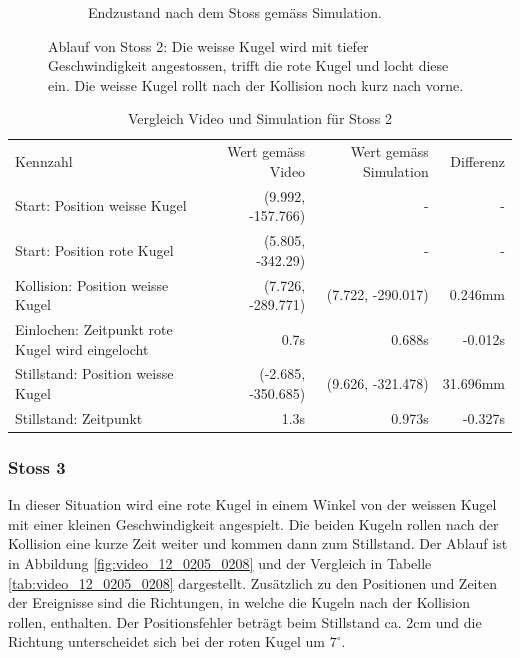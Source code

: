 \begin{figure}[h!]
\begin{subfigure}[t]{0.2\textwidth}
        \caption{Endzustand nach dem Stoss gemäss Simulation.}
        \label{fig:simulation_vs_reality_1_0028_0032_simulation}
    \end{subfigure}
    \caption{
        Ablauf von Stoss 2: Die weisse Kugel wird mit tiefer Geschwindigkeit angestossen, trifft die rote Kugel und locht diese ein.
        Die weisse Kugel rollt nach der Kollision noch kurz nach vorne.
    }
    \label{fig:simulation_vs_reality_1_0028_0032}
\end{figure}

\begin{table}[ht]
    \begin{tabular}{ lrrr }
        \rowcolor{\seccolor!50}
        Kennzahl & Wert gemäss Video & Wert gemäss Simulation & Differenz \\
        Start: Position weisse Kugel & (9.992, -157.766) & - & -\\
        Start: Position rote Kugel & (5.805, -342.29) & - & -\\
        Kollision: Position weisse Kugel & (7.726, -289.771) & (7.722, -290.017) & 0.246mm\\
        Einlochen: Zeitpunkt rote Kugel wird eingelocht & 0.7s & 0.688s & -0.012s\\
        Stillstand: Position weisse Kugel & (-2.685, -350.685) & (9.626, -321.478) & 31.696mm\\
        Stillstand: Zeitpunkt & 1.3s & 0.973s & -0.327s\\
    \end{tabular}
    \caption{Vergleich Video und Simulation für Stoss 2}
    \label{tab:simulation_vs_reality_1_0028_0032}
\end{table}

\subsubsection{Stoss 3}
In dieser Situation wird eine rote Kugel in einem Winkel von der weissen Kugel mit einer kleinen Geschwindigkeit angespielt.
Die beiden Kugeln rollen nach der Kollision eine kurze Zeit weiter und kommen dann zum Stillstand.
Der Ablauf ist in Abbildung \ref{fig:video_12_0205_0208} und der Vergleich in Tabelle \ref{tab:video_12_0205_0208} dargestellt.
Zusätzlich zu den Positionen und Zeiten der Ereignisse sind die Richtungen, in welche die Kugeln nach der Kollision
rollen, enthalten.
Der Positionsfehler beträgt beim Stillstand ca. 2cm und die Richtung unterscheidet sich bei der roten Kugel um $7^{\circ}$.

